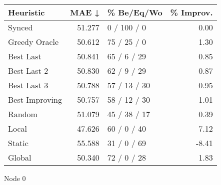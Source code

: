 \begin{tabular}{lrlr}
\toprule
\textbf{Heuristic} & \textbf{MAE ↓} & \textbf{\% Be/Eq/Wo} & \textbf{\% Improv.} \\
\midrule
            Synced &         51.277 &          0 / 100 / 0 &                0.00 \\
     Greedy Oracle &         50.612 &          75 / 25 / 0 &                1.30 \\
         Best Last &         50.841 &          65 / 6 / 29 &                0.85 \\
       Best Last 2 &         50.830 &          62 / 9 / 29 &                0.87 \\
       Best Last 3 &         50.788 &         57 / 13 / 30 &                0.95 \\
    Best Improving &         50.757 &         58 / 12 / 30 &                1.01 \\
            Random &         51.079 &         45 / 38 / 17 &                0.39 \\
             Local &         47.626 &          60 / 0 / 40 &                7.12 \\
            Static &         55.588 &          31 / 0 / 69 &               -8.41 \\
            Global &         50.340 &          72 / 0 / 28 &                1.83 \\
\bottomrule
\end{tabular}
\caption{Node 0}
\label{tab:non_lr01_le2_bs4_0}
